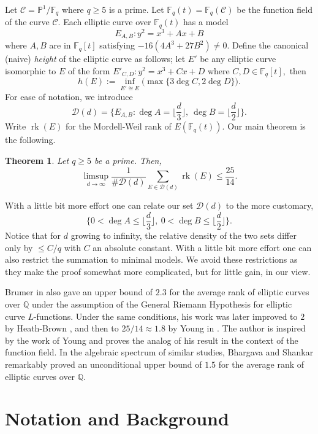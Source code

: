 \documentclass[12pt,reqno]{amsart}
\newcommand{\PP}{\mathbb{P}}
\newcommand{\BF}{\mathbb{F}}
\newcommand{\CC}{\mathcal{C}}
\DeclareMathOperator{\rk}{rk}
\newtheorem{thm}[lem]{Theorem}
\begin{document}
Let $\CC = \PP^{1}/\BF_{q}$ where $q \geq 5$ is a prime. Let $\BF_{q}(t)=\BF_q(\CC)$ be the function field of the curve $\mathcal{C}$. Each elliptic curve over $\BF_{q}(t)$ has a model
$$
E_{A,B} : y^2 = x^3 + Ax +B 
$$
where $A,B$ are in $\BF_{q}[t]$ satisfying $-16(4A^3 + 27B^2)\neq 0$. %
Define the canonical (naive) \textit{height} of the elliptic curve as follows; let $E'$ be any elliptic curve isomorphic to $E$ of the form $ E'_{C,D} : y^2= x^3+Cx+D$ where $C,D \in \BF_{q}[t],$ then
$$
h(E) := \inf_{E' \cong E}\Big(\max \{3\deg C, 2\deg D\} \Big).
$$
For ease of notation, we introduce 
$$
\mathcal{D}(d) = \{ E_{A,B} : \deg A =  \big \lfloor \frac{d}{3} \big \rfloor,\ \deg B = \big \lfloor \frac{d}{2} \big \rfloor  \}. 
$$
Write $\rk(E)$ for the Mordell-Weil rank of $E(\BF_{q}(t))$.
Our main theorem is the following. 
\begin{thm}
    Let $q \geq 5$ be a prime. Then, 
    $$
        \limsup_{d \rightarrow \infty} \frac{1}{\#\mathcal{D}(d)} \sum_{E \in \mathcal{D}(d)} \rk(E) \leq  \frac{25}{14}.
    $$
\end{thm}
With a little bit more effort one can relate our set $\mathcal{D}(d)$ to the more customary, 
$$
\{ 0 < \deg A \leq \big \lfloor \frac{d}{3} \big \rfloor , \ 0 < \deg B \leq \big \lfloor \frac{d}{2} \big \rfloor \}.
$$
Notice that for $d$ growing to infinity, the relative density of the two sets differ only by $\leq C / q$ with $C$ an absolute constant. With a little bit more effort one can also restrict the summation to minimal models. We avoid these restrictions as they make the proof somewhat more complicated, but for little gain, in our view. 

Brumer in \cite{Brumer} also gave an upper bound of $2.3$ for the average rank of elliptic curves over $\mathbb{Q}$  under the assumption of the General Riemann Hypothesis for elliptic curve $L$-functions. Under the same conditions, his work was later improved to $2$ by Heath-Brown \cite{HBrown}, and then to $25/14 \approx 1.8$ by Young in \cite{Matthew}. The author is inspired by the work of Young \cite{Matthew} and proves the analog of his result in the context of the function field. In the algebraic spectrum of similar studies, Bhargava and Shankar \cite{Bha-Shankar} remarkably proved an unconditional upper bound of $1.5$ for the average rank of elliptic curves over $\mathbb{Q}$. %

\section{Notation and Background}
\end{document}
